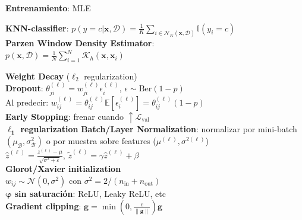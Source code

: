 \documentclass[11pt, a4paper]{article}
\newcommand{\x}{\mathbf{x}}
\newcommand{\Loss}{\mathcal{L}}
\begin{document}
\begin{minipage}[t]{0.325\textwidth}
\begin{tcolorbox}[formulabox=Naive Bayes, colframe=softRed]
        \textbf{Entrenamiento}: MLE
    \end{tcolorbox}
    \begin{tcolorbox}[formulabox=Non-Parametric Methods, colframe=softRed]
        \textbf{KNN-classifier}: 
        $p(y=c|\x, \mathcal{D}) = \frac{1}{K} \sum_{i\in\mathcal{N}_K(\x, \mathcal{D})}\mathbb{I}(y_i=c)$\\
        \textbf{Parzen Window Density Estimator}:\\
        $p(\x, \mathcal{D}) = \tfrac{1}{N}\sum_{i=1}^N \mathcal{K}_h(\x, \x_i)$\\
    \end{tcolorbox}
    \begin{tcolorbox}[formulabox=NN Regularization + $\grad$ vanishing sol., colframe=softPurple]
        \textbf{Weight Decay} ($\ell_2$ regularization) \\
        \textbf{Dropout}: $\theta_{ji}^{(\ell)}=w_{ji}^{(\ell)}\epsilon_{i}^{(\ell)}$, $\epsilon\sim\text{Ber}(1-p)$ \\
        Al predecir: $w_{ij}^{(\ell)} = \theta_{ij}^{(\ell)}\mathbb{E}[\epsilon_i^{(\ell)}] = \theta_{ij}^{(\ell)}(1-p)$\\[2pt]
        \textbf{Early Stopping}: frenar cuando $\uparrow \Loss_\text{val}$ \\[2pt]
        \textbf{$\boldsymbol{\ell_1}$ regularization}
        \vspace{-2mm}
        \tcbline
        \vspace{-2mm}
        \textbf{Batch/Layer Normalization}: normalizar por mini-batch $(\mu_\mathcal{B}, \sigma^2_\mathcal{B})$ o por muestra sobre features ($\mu^{(\ell)}, \sigma^{2(\ell)}$) \\
        $\hat{z}^{(\ell)} = \tfrac{z^{(\ell)} - \mu}{\sqrt{\sigma^2+\varepsilon}}$,\quad
        $\tilde{z}^{(\ell)} = \gamma\hat{z}^{(\ell)} + \beta$\\
        \textbf{Glorot/Xavier initialization} \\
        $w_{ij}\sim \mathcal{N}(0,\sigma^2)$ con $\sigma^2 = 2/(n_{\text{in}}+n_{\text{out}})$ \\
        \textbf{$\boldsymbol{\varphi}$ sin saturación}: ReLU, Leaky ReLU, etc \\
        \textbf{Gradient clipping}: $\mathbf{g} = \min\left(0, \tfrac{c}{\|\mathbf{g}\|}\right)\mathbf{g}$ \\
    \end{tcolorbox}
    \begin{tcolorbox}[formulabox=Maximum A Posteriori (MAP), colframe=softTeal]

\end{tcolorbox}
\end{minipage}
\end{document}
